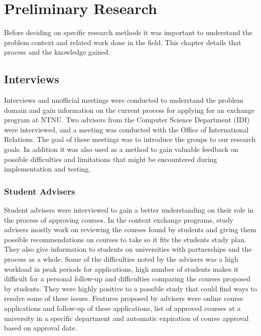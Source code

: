 \chapter{Preliminary Research} \label{chap:2}
Before deciding on specific research methods it was important to understand the problem context and related work done in the field. This chapter details that process and the knowledge gained.  

\section{Interviews}
Interviews and unofficial meetings were conducted to understand the problem domain and gain information on the current process for applying for an exchange program at NTNU. Two advisers from the Computer Science Department (IDI) were interviewed, and a meeting was conducted with the Office of International Relations. The goal of these meetings was to introduce the groups to our research goals. In addition it was also used as a method to gain valuable feedback on possible difficulties and limitations that might be encountered during implementation and testing. 

\subsection{Student Advisers} Student advisers were interviewed to gain a better understanding on their role in the process of approving courses. In the context exchange programs, study advisers mostly work on reviewing the courses found by students and giving them possible recommendations on courses to take so it fits the students study plan. They also give information to students on universities with partnerships and the process as a whole. Some of the difficulties noted by the advisers was a high workload in peak periods for applications, high number of students makes it difficult for a personal follow-up and difficulties comparing the courses proposed by students. They were highly positive to a possible study that could find ways to resolve some of these issues. Features proposed by advisers were online course applications and follow-up of these applications, list of approved courses at a university in a specific department and automatic expiration of course approval based on approval date. 

